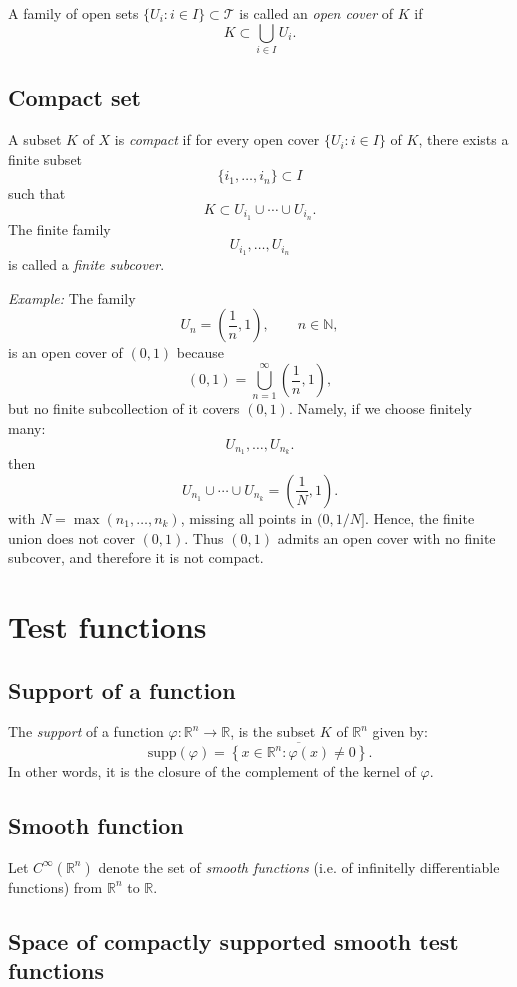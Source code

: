 \documentclass[aps,prl,twocolumn,groupedaddress]{revtex4-2}
\newcommand{\RR}{\mathbb{R}}
\newcommand{\supp}{\mathrm{supp}}
\begin{document}
A family of open sets $\{U_i:i\in I\}\subset\mathcal T$ is called an {\em open cover} of $K$ if
$$
K\subset \bigcup_{i\in I} U_i.
$$

\subsection{Compact set}

A subset $K$ of $X$ is {\em compact} if for every open cover $\{U_i:i\in I\}$ of $K$, there exists a finite subset
$$
\{i_1,\dots,i_n\}\subset I
$$
such that
$$
K\subset
U_{i_1}\cup\cdots\cup U_{i_n}.
$$
The finite family
$$
{U_{i_1},\dots,U_{i_n}}
$$
is called a {\em finite subcover}.

{\em Example:}
The family
$$
U_n=\left(\frac1n,1\right),
\qquad n\in\mathbb N,
$$
is an open cover of $(0,1)$ because
$$
(0,1)
=
\bigcup_{n=1}^\infty
\left(\frac1n,1\right),
$$
but no finite subcollection of it covers $(0,1)$.
Namely, if we choose finitely many:
$$
U_{n_1},\dots,U_{n_k}.
$$
then 
$$
U_{n_1}\cup\cdots\cup U_{n_k}
=
\left(\frac1N,1\right).
$$
with $N=\max(n_1,\dots,n_k)$, missing all points in $(0,1/N]$.
Hence, the finite union does not cover $(0,1)$.
Thus $(0,1)$ admits an open cover with no finite subcover, and therefore it is not compact.

\section{Test functions}

\subsection{Support of a function}

The {\em support} of a function $\varphi : \RR^n\to \RR$, is the subset $K$ of $\RR^n$ given by:
$$
\supp(\varphi)
=
\overline{
\left\{
x\in \RR^n
:
\varphi(x) \neq 0
\right\}
}.
$$
In other words, it is the closure of the complement of the kernel of $\varphi$.

\subsection{Smooth function}

Let $C^{\infty}(\RR^n)$ denote the set of {\em smooth functions} (i.e. of infinitelly differentiable functions) from $\RR^n$ to $\RR$.

\subsection{Space of compactly supported smooth test functions}
\end{document}
